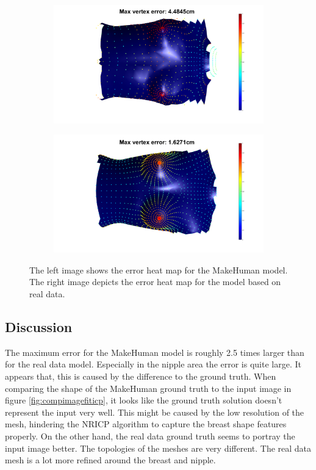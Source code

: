 \begin{figure}
\centering
\begin{subfigure}{.5\textwidth}
  \centering
  \includegraphics[width=1.1\linewidth]{figures/ceresMhErrorMapBefore}
\end{subfigure}%
\begin{subfigure}{.5\textwidth}
  \centering
  \includegraphics[width=1.1\linewidth]{figures/ceresRealErrorMapBefore}
\end{subfigure}
\caption[Parametric model comparison]{The left image shows the error heat map for the MakeHuman model. The right image depicts the error heat map for the model based on real data.}
\label{fig:compparammodel}
\end{figure}

\subsection{Discussion}
The maximum error for the MakeHuman model is roughly 2.5 times larger than for the real data model. Especially in the nipple area the error is quite large. It appears that, this is caused by the difference to the ground truth. When comparing the shape of the MakeHuman ground truth to the input image in figure \ref{fig:compimagefiticp}, it looks like the ground truth solution doesn't represent the input very well. This might be caused by the low resolution of the mesh, hindering the NRICP algorithm to capture the breast shape features properly. On the other hand, the real data ground truth seems to portray the input image better. The topologies of the meshes are very different. The real data mesh is a lot more refined around the breast and nipple.

